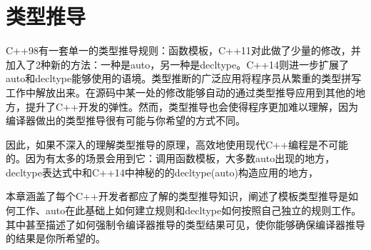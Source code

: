\chapter{类型推导}
C++98有一套单一的类型推导规则：函数模板，C++11对此做了少量的修改，并加入了2种新的方法：一种是{\M auto}，另一种是{\M decltype}。C++14则进一步扩展了{\M auto}和{\M decltype}能够使用的语境。类型推断的广泛应用将程序员从繁重的类型拼写工作中解放出来。在源码中某一处的修改能够自动的通过类型推导应用到其他的地方，提升了C++开发的弹性。然而，类型推导也会使得程序更加难以理解，因为编译器做出的类型推导很有可能与你希望的方式不同。

因此，如果不深入的理解类型推导的原理，高效地使用现代C++编程是不可能的。因为有太多的场景会用到它：调用函数模板，大多数{\M auto}出现的地方，{\M decltype}表达式中和C++14中神秘的的{\M decltype(auto)}构造应用的地方，

本章涵盖了每个C++开发者都应了解的类型推导知识，阐述了模板类型推导是如何工作、{\M auto}在此基础上如何建立规则和{\M decltype}如何按照自己独立的规则工作。其中甚至描述了如何强制令编译器推导的类型结果可见，使你能够确保编译器推导的结果是你所希望的。



